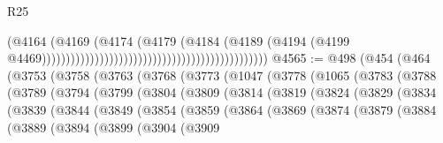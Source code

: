 \begin{lexlean}{R25}
\begin{coremodule}
                                                                                  (@4164
                                                                                    (@4169
                                                                                      (@4174
                                                                                        (@4179
                                                                                          (@4184
                                                                                            (@4189
                                                                                              (@4194
                                                                                                (@4199
                                                                                                  @4469)))))))))))))))))))))))))))))))))))))))))))))))
@4565 := @498
    (@454
      (@464
        (@3753
          (@3758
            (@3763
              (@3768
                (@3773
                  (@1047
                    (@3778
                      (@1065
                        (@3783
                          (@3788
                            (@3789
                              (@3794
                                (@3799
                                  (@3804
                                    (@3809
                                      (@3814
                                        (@3819
                                          (@3824
                                            (@3829
                                              (@3834
                                                (@3839
                                                  (@3844
                                                    (@3849
                                                      (@3854
                                                        (@3859
                                                          (@3864
                                                            (@3869
                                                              (@3874
                                                                (@3879
                                                                  (@3884
                                                                    (@3889
                                                                      (@3894
                                                                        (@3899
                                                                          (@3904
                                                                            (@3909

\end{coremodule}
\end{lexlean}

